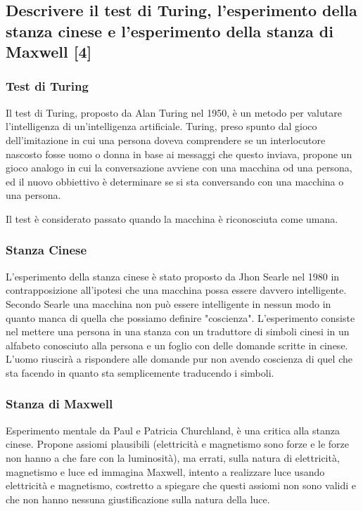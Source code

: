 \documentclass[\main/main.tex]{subfiles}
\begin{document}
\subsection{Descrivere il test di Turing, l'esperimento della stanza cinese e l'esperimento della stanza di Maxwell [4]}
\subsubsection{Test di Turing}
Il test di Turing, proposto da Alan Turing nel 1950, è un metodo per valutare l'intelligenza di un'intelligenza artificiale. Turing, preso spunto dal gioco dell'imitazione in cui una persona doveva comprendere se un interlocutore nascosto fosse uomo o donna in base ai messaggi che questo inviava, propone un gioco analogo in cui la conversazione avviene con una macchina od una persona, ed il nuovo obbiettivo è determinare se si sta conversando con una macchina o una persona.

Il test è considerato passato quando la macchina è riconosciuta come umana.

\subsubsection{Stanza Cinese}
L'esperimento della stanza cinese è stato proposto da Jhon Searle nel 1980 in contrapposizione all'ipotesi che una macchina possa essere davvero intelligente. Secondo Searle una macchina non può essere intelligente in nessun modo in quanto manca di quella che possiamo definire "coscienza". L'esperimento consiste nel mettere una persona in una stanza con un traduttore di simboli cinesi in un alfabeto conosciuto alla persona e un foglio con delle domande scritte in cinese. L'uomo riuscirà a rispondere alle domande pur non avendo coscienza di quel che sta facendo in quanto sta semplicemente traducendo i simboli.

\subsubsection*{Stanza di Maxwell}
Esperimento mentale da Paul e Patricia Churchland, è una critica alla stanza cinese. Propone assiomi plausibili (elettricità e magnetismo sono forze e le forze non hanno a che fare con la luminosità), ma errati, sulla natura di elettricità, magnetismo e luce ed immagina Maxwell, intento a realizzare luce usando elettricità e magnetismo, costretto a spiegare che questi assiomi non sono validi e che non hanno nessuna giustificazione sulla natura della luce.
\end{document}
